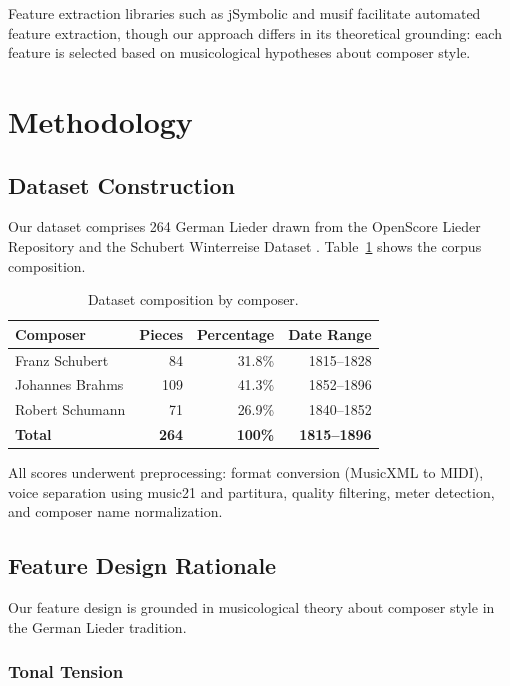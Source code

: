 \documentclass{article}
\begin{document}
Feature extraction libraries such as jSymbolic \cite{McKay2006} and musif \cite{Llorens2023} facilitate automated feature extraction, though our approach differs in its theoretical grounding: each feature is selected based on musicological hypotheses about composer style.

\section{Methodology}\label{sec:methodology}

\subsection{Dataset Construction}

Our dataset comprises 264 German Lieder drawn from the OpenScore Lieder Repository \cite{OpenScore2023} and the Schubert Winterreise Dataset \cite{Winterreise2022}. Table~\ref{tab:dataset} shows the corpus composition.

\begin{table}[h]
\centering
\caption{Dataset composition by composer.}
\label{tab:dataset}
\begin{tabular}{lrrr}
\toprule
Composer & Pieces & Percentage & Date Range \\
\midrule
Franz Schubert & 84 & 31.8\% & 1815--1828 \\
Johannes Brahms & 109 & 41.3\% & 1852--1896 \\
Robert Schumann & 71 & 26.9\% & 1840--1852 \\
\midrule
\textbf{Total} & \textbf{264} & \textbf{100\%} & \textbf{1815--1896} \\
\bottomrule
\end{tabular}
\end{table}

All scores underwent preprocessing: format conversion (MusicXML to MIDI), voice separation using music21 \cite{Cuthbert2010} and partitura, quality filtering, meter detection, and composer name normalization.

\subsection{Feature Design Rationale}

Our feature design is grounded in musicological theory about composer style in the German Lieder tradition.

\subsubsection{Tonal Tension}
\end{document}
